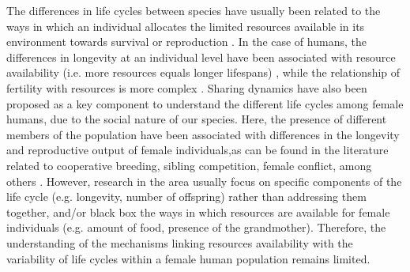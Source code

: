 \documentclass{article}
\begin{document}
The differences in life cycles between species have usually been related to the ways in which an individual allocates the limited resources available in its environment towards survival or reproduction \citep{stearns2000life}. In the case of humans, the differences in longevity at an individual level have been associated with resource availability (i.e. more resources equals longer lifespans) \citep{kaplan2003embodied}, while the relationship of fertility with resources is more complex \citep{mulder1998demographic,sear2016understanding}. Sharing dynamics have also been proposed as a key component to understand the different life cycles among female humans, due to the social nature of our species. Here, the presence of different members of the population have been associated with differences in the longevity and reproductive output of female individuals,as can be found in the literature related to cooperative breeding, sibling competition, female conflict, among others \citep{ivey2000cooperative,nitsch2013elder,mace2012female,sear2011much}. However, research in the area usually focus on specific components of the life cycle (e.g. longevity, number of offspring) rather than addressing them together, and/or black box the ways in which resources are available for female individuals (e.g. amount of food, presence of the grandmother). Therefore, the understanding of the mechanisms linking resources availability with the variability of life cycles within a female human population remains limited.
\\\\
\end{document}
